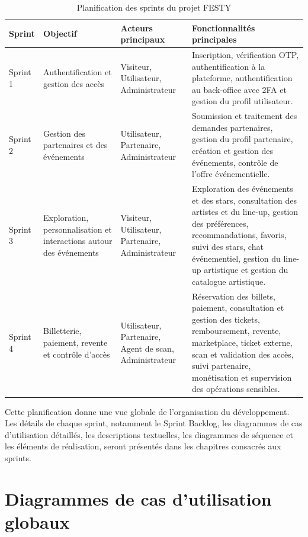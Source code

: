 \begin{table}[H]
\centering
\caption{Planification des sprints du projet FESTY}
\label{tableau:2-7}
\renewcommand{\arraystretch}{1.2}
\begin{tabularx}{\textwidth}{|>{\raggedright\arraybackslash}X|>{\raggedright\arraybackslash}X|>{\raggedright\arraybackslash}X|>{\raggedright\arraybackslash}X|}
\hline
\rowcolor[HTML]{ECF4FF}
\textbf{Sprint} & \textbf{Objectif} & \textbf{Acteurs principaux} & \textbf{Fonctionnalités principales} \\
\hline
Sprint 1 & Authentification et gestion des accès & Visiteur, Utilisateur, Administrateur & Inscription, vérification OTP, authentification à la plateforme, authentification au back-office avec 2FA et gestion du profil utilisateur. \\
\hline
Sprint 2 & Gestion des partenaires et des événements & Utilisateur, Partenaire, Administrateur & Soumission et traitement des demandes partenaires, gestion du profil partenaire, création et gestion des événements, contrôle de l’offre événementielle. \\
\hline
Sprint 3 & Exploration, personnalisation et interactions autour des événements & Visiteur, Utilisateur, Partenaire, Administrateur & Exploration des événements et des stars, consultation des artistes et du line-up, gestion des préférences, recommandations, favoris, suivi des stars, chat événementiel, gestion du line-up artistique et gestion du catalogue artistique. \\
\hline
Sprint 4 & Billetterie, paiement, revente et contrôle d’accès & Utilisateur, Partenaire, Agent de scan, Administrateur & Réservation des billets, paiement, consultation et gestion des tickets, remboursement, revente, marketplace, ticket externe, scan et validation des accès, suivi partenaire, monétisation et supervision des opérations sensibles. \\
\hline
\end{tabularx}
\end{table}


Cette planification donne une vue globale de l’organisation du développement. Les détails de chaque sprint, notamment le Sprint Backlog, les diagrammes de cas d’utilisation détaillés, les descriptions textuelles, les diagrammes de séquence et les éléments de réalisation, seront présentés dans les chapitres consacrés aux sprints.


\section{Diagrammes de cas d’utilisation globaux}


